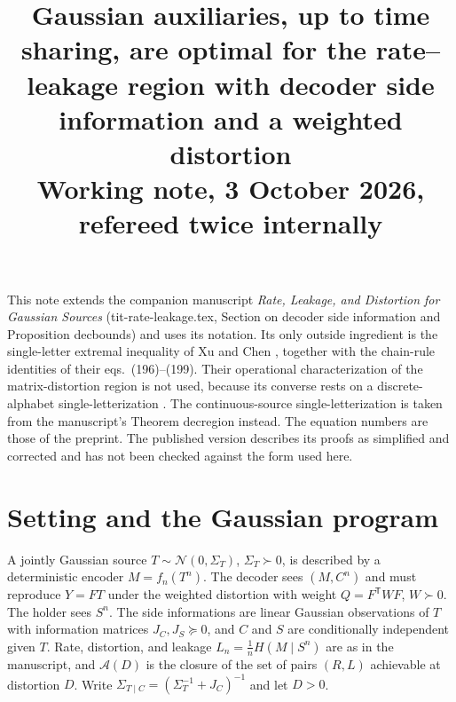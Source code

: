 \documentclass[11pt]{article}
\title{Gaussian auxiliaries, up to time sharing, are optimal for the rate--leakage region with decoder side information and a weighted distortion\\[4pt]\large Working note, 3 October 2026, refereed twice internally}
\author{}
\date{}
\theoremstyle{remark}
\begin{document}
\maketitle

\noindent This note extends the companion manuscript \emph{Rate, Leakage, and Distortion for Gaussian Sources} (tit-rate-leakage.tex, Section on decoder side information and Proposition decbounds) and uses its notation. Its only outside ingredient is the single-letter extremal inequality of Xu and Chen \cite[Theorem~4, eq.~(200)]{xuchen2021}, together with the chain-rule identities of their eqs.~(196)--(199). Their operational characterization of the matrix-distortion region is not used, because its converse rests on a discrete-alphabet single-letterization \cite[eq.~(196), citing Villard and Piantanida]{xuchen2021}. The continuous-source single-letterization is taken from the manuscript's Theorem decregion instead. The equation numbers are those of the preprint. The published version \cite{xu2024} describes its proofs as simplified and corrected and has not been checked against the form used here.

\section{Setting and the Gaussian program}

A jointly Gaussian source $T\sim\mathcal N(0,\Sigma_T)$, $\Sigma_T\succ0$, is described by a deterministic encoder $M=f_n(T^n)$. The decoder sees $(M,C^n)$ and must reproduce $Y=FT$ under the weighted distortion with weight $Q=F^{\mathsf T}WF$, $W\succ0$. The holder sees $S^n$. The side informations are linear Gaussian observations of $T$ with information matrices $J_C,J_S\succeq0$, and $C$ and $S$ are conditionally independent given $T$. Rate, distortion, and leakage $L_n=\tfrac1nH(M\mid S^n)$ are as in the manuscript, and $\mathcal A(D)$ is the closure of the set of pairs $(R,L)$ achievable at distortion $D$. Write $\Sigma_{T\mid C}=(\Sigma_T^{-1}+J_C)^{-1}$ and let $D>0$.
\end{document}
